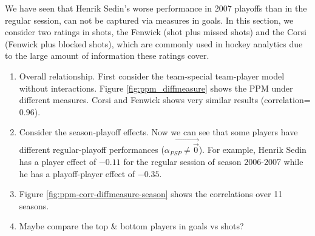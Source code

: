 We have seen that Henrik Sedin's worse performance in 2007 playoffs than in the regular session, can not be captured via measures in goals. In this section, we consider two ratings in shots, the Fenwick (shot plus missed shots) and the Corsi (Fenwick plus blocked shots), which are commonly used in hockey analytics due to the large amount of information these ratings cover. 

\begin{enumerate}
    \item Overall relationship. First consider the team-special team-player model without interactions. Figure \ref{fig:ppm_diffmeasure} shows the PPM under different measures. Corsi and Fenwick shows very similar results (correlation=$0.96$). 
    \item Consider the season-playoff effects. Now we can see that some players have different regular-playoff performances ($\vec{\alpha_{PSP}\neq \vec{0}}$). For example, Henrik Sedin has a player effect of $-0.11$ for the regular session of season 2006-2007 while he has a playoff-player effect of $-0.35$.
    \item Figure \ref{fig:ppm-corr-diffmeasure-season} shows the correlations over 11 seasons. 
    \item Maybe compare the top \& bottom players in goals vs shots?
\end{enumerate}

